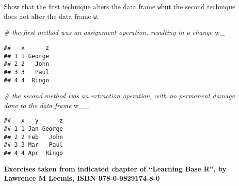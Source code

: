 \documentclass[]{article}
\newenvironment{Shaded}{\begin{snugshade}}{\end{snugshade}}
\newcommand{\CommentTok}[1]{\textcolor[rgb]{0.56,0.35,0.01}{\textit{#1}}}
\newcommand{\NormalTok}[1]{#1}
\begin{document}
Show that the first technique alters the data frame \texttt{w}but the
second technique does not alter the data frame \texttt{w}.

\begin{Shaded}
\begin{Highlighting}[]
\CommentTok{# the first method was an assignment operation, resulting in a change}
\NormalTok{w_}
\end{Highlighting}
\end{Shaded}

\begin{verbatim}
##   x      z
## 1 1 George
## 2 2   John
## 3 3   Paul
## 4 4  Ringo
\end{verbatim}

\begin{Shaded}
\begin{Highlighting}[]
\CommentTok{# the second method was an extraction operation, with no permanent damage done to the data frame}
\NormalTok{w__}
\end{Highlighting}
\end{Shaded}

\begin{verbatim}
##   x   y      z
## 1 1 Jan George
## 2 2 Feb   John
## 3 3 Mar   Paul
## 4 4 Apr  Ringo
\end{verbatim}

\textbf{Exercises taken from indicated chapter of ``Learning Base R'',
by Lawrence M Leemis, ISBN 978-0-9829174-8-0}
\end{document}
